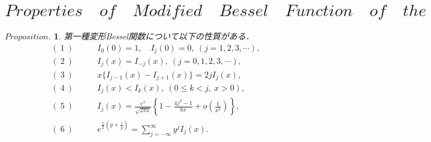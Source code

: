 \documentclass[a4j,papersize,disablejfam,slide,14pt]{jsarticle}
\newtheorem{Prop}{$Proposition.$}
\def\exp#1{e^{#1}} %
\begin{document}
\section{$Properties\quad of\quad Modified\quad Bessel\quad Function\quad of\quad the\quad First\quad Kind$}
\label{sec:appendix_bessel_property}
	\begin{screen}
		\begin{Prop}
    		第一種変形{\rm Bessel}関数について以下の性質がある．
        	\begin{align}
        		(\ 1\ ) &\qquad I_0(0) = 1,\quad I_j(0) = 0,\ (j = 1,2,3,\cdots), \\
            	(\ 2\ ) &\qquad I_j(x) = I_{-j}(x),\ (j = 0,1,2,3,\cdots), \\
            	(\ 3\ ) &\qquad x\{I_{j-1}(x) - I_{j+1}(x)\} = 2jI_j(x), \\
            	(\ 4\ ) &\qquad I_j(x) < I_k(x),\ (0 \leq k < j,\ x > 0), \\
            	(\ 5\ ) &\qquad I_j(x) = \frac{\exp{x}}{\sqrt{2 \pi x}} \left\{ 1-\frac{4j^2 - 1}{8x} + o\left( \frac{1}{x^2} \right) \right\}, \\
                (\ 6\ ) &\qquad \exp{\frac{x}{2}\left(y + \frac{1}{y}\right)} = \sum_{j=-\infty}^{\infty} y^jI_j(x). 
        	\end{align}
    	\end{Prop}
    \end{screen}
\end{document}
